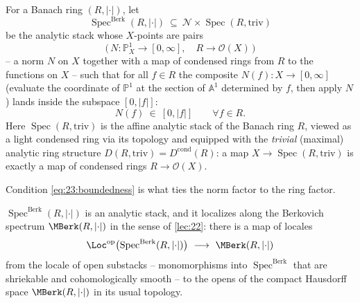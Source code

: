 \begin{definition}
\label{def:23:berkovich-spectrum}
For a Banach ring $(R,\lvert\cdot\rvert)$, let
\begin{equation*}
\operatorname{Spec}^{\mathrm{Berk}}(R,\lvert\cdot\rvert)\ \subseteq\
\mathcal N\times\operatorname{Spec}(R,\mathrm{triv})
\end{equation*}
be the analytic stack whose $X$-points are pairs
\begin{equation*}
\bigl(\,N\colon\mathbb P^1_X\to[0,\infty],\quad R\to\mathcal O(X)\,\bigr)
\end{equation*}
-- a norm $N$ on $X$ together with a map of condensed rings from $R$ to the
functions on $X$ -- such that for all $f\in R$ the composite
$N(f)\colon X\to[0,\infty]$ (evaluate the coordinate of $\mathbb P^1$ at the
section of $\mathbb A^1$ determined by $f$, then apply $N$) lands inside the
subspace $[0,\lvert f\rvert]$:
\begin{equation}
\label{eq:23:boundedness}
N(f)\ \in\ [0,\lvert f\rvert]\qquad\forall f\in R .
\end{equation}
Here $\operatorname{Spec}(R,\mathrm{triv})$ is the affine analytic stack of the
Banach ring $R$, viewed as a light condensed ring via its topology and equipped
with the \emph{trivial} (maximal) analytic ring structure
$D(R,\mathrm{triv})=D^{\mathrm{cond}}(R)$: a map $X\to\operatorname{Spec}(R,\mathrm{triv})$
is exactly a map of condensed rings $R\to\mathcal O(X)$.
\end{definition}

Condition \eqref{eq:23:boundedness} is what ties the norm factor to the ring
factor.

\begin{theorem}
\label{thm:23:localizes}
$\operatorname{Spec}^{\mathrm{Berk}}(R,\lvert\cdot\rvert)$ is an analytic stack,
and it localizes along the Berkovich spectrum
$\MBerk(R,\lvert\cdot\rvert)$ in the sense of \cref{lec:22}: there is a map of
locales
\begin{equation}
\label{eq:23:loc-map}
\Loc^{\mathrm{op}}\bigl(\operatorname{Spec}^{\mathrm{Berk}}(R,\lvert\cdot\rvert)\bigr)
\ \longrightarrow\ \MBerk(R,\lvert\cdot\rvert)
\end{equation}
from the locale of open substacks -- monomorphisms into
$\operatorname{Spec}^{\mathrm{Berk}}$ that are shriekable and cohomologically
smooth -- to the opens of the compact Hausdorff space
$\MBerk(R,\lvert\cdot\rvert)$ in its usual topology.
\end{theorem}

